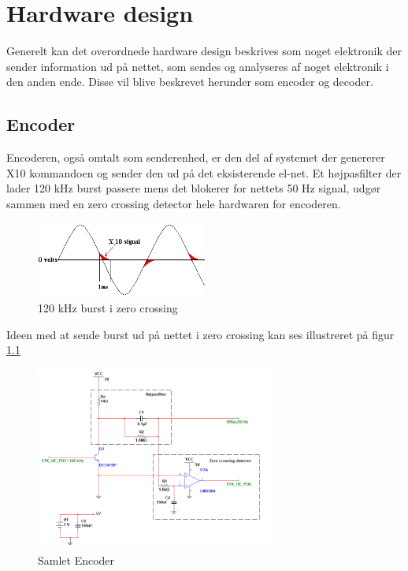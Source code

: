\chapter{Hardware design}
Generelt kan det overordnede hardware design beskrives som noget elektronik der sender information ud på nettet, som sendes og analyseres af noget elektronik i den anden ende. Disse vil blive beskrevet herunder som encoder og decoder.  


\section{Encoder}
Encoderen, også omtalt som senderenhed, er den del af systemet der genererer X10 kommandoen og sender den ud på det eksisterende el-net. Et højpasfilter der lader 120 kHz burst passere mens det blokerer for nettets 50 Hz signal, udgør sammen med en zero crossing detector hele hardwaren for encoderen.

\begin{figure}[htbp]
	\centering
	\includegraphics[width=0.50\textwidth]{billeder/HWdesign/X10_BURST}
	\caption{120 kHz burst i zero crossing}
	\label{fig:X10_BURST}
\end{figure}

Ideen med at sende burst ud på nettet i zero crossing kan ses illustreret på figur \ref{fig:X10_BURST}

\begin{figure}[htbp]
	\centering
	\includegraphics[width=0.70\textwidth]{billeder/HWdesign/Encoder}
	\caption{Samlet Encoder}
	\label{fig:Encoder}
\end{figure}
\newpage


